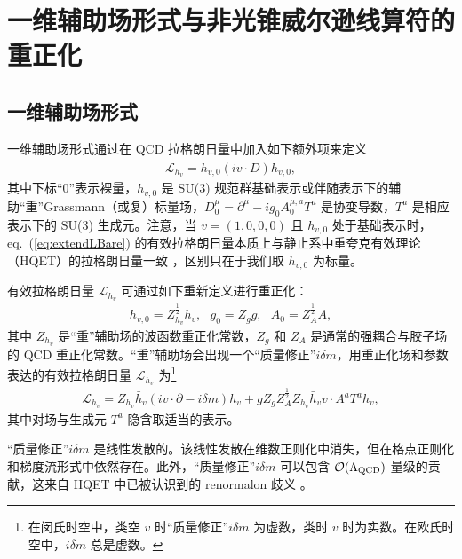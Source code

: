 \section{一维辅助场形式与非光锥威尔逊线算符的重正化}
\label{sec:EFT}
\subsection{一维辅助场形式}
一维辅助场形式通过在 QCD 拉格朗日量中加入如下额外项来定义 \cite{Dorn:1986dt}
\begin{eqnarray}
\label{eq:extendLBare}
\mathcal{L}_{h_v} =\bar{h}_{v, 0} (iv\cdot D) h_{v, 0},
\end{eqnarray}
其中下标“$0$”表示裸量，$h_{v, 0}$ 是 SU($3$) 规范群基础表示或伴随表示下的辅助``重''Grassmann（或复）标量场，$D_0^{\mu} = \partial^{\mu} - ig_{0}A_0^{\mu, a}T^a$ 是协变导数，$T^a$ 是相应表示下的 SU($3$) 生成元。注意，当 $v=(1,0,0,0)$ 且 $h_{v, 0}$ 处于基础表示时，eq.~(\ref{eq:extendLBare}) 的有效拉格朗日量本质上与静止系中重夸克有效理论（HQET）的拉格朗日量一致 \cite{Eichten:1989zv}，区别只在于我们取 $h_{v, 0}$ 为标量。

有效拉格朗日量 $\mathcal{L}_{h_v}$ 可通过如下重新定义进行重正化：
\begin{eqnarray}
h_{v, 0} = Z_{h_v}^{\frac{1}{2}} h_v,\, \, \, \, g_0 =Z_g g,\, \, \, \,   A_0 = Z_A^{\frac{1}{2}} A,
\end{eqnarray}
其中 $Z_{h_v}$ 是``重''辅助场的波函数重正化常数，$Z_g$ 和 $Z_A$ 是通常的强耦合与胶子场的 QCD 重正化常数。``重''辅助场会出现一个``质量修正''$i\delta m$，用重正化场和参数表达的有效拉格朗日量 $\mathcal{L}_{h_v}$ 为\footnote{在闵氏时空中，类空 $v$ 时``质量修正''$i\delta m$ 为虚数，类时 $v$ 时为实数。在欧氏时空中，$i\delta m$ 总是虚数。}
\begin{eqnarray}
\label{eq:extendLRen}
\mathcal{L}_{h_v} =Z_{h_v}\bar{h}_v (iv\cdot \partial - i\delta m) h_v + gZ_gZ_A^{\frac{1}{2}}Z_{h_v} \bar{h}_v v\cdot A^{a}T^a h_v,
\end{eqnarray}
其中对场与生成元 $T^a$ 隐含取适当的表示。

``质量修正''$i\delta m$ 是线性发散的。该线性发散在维数正则化中消失，但在格点正则化和梯度流形式中依然存在。此外，``质量修正''$i\delta m$ 可以包含 $\mathcal{O}(\Lambda_{\rm QCD})$ 量级的贡献，这来自 HQET 中已被认识到的 renormalon 歧义 \cite{Bigi:1994em, Beneke:1994sw}。

